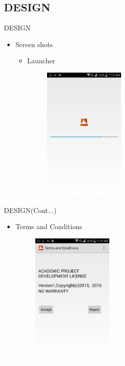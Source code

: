   
\subsection{DESIGN}
\begin{frame}{DESIGN}
\begin{itemize}
  	\item Screen shots  
   \begin{itemize}
  	\item Launcher 
 	 \begin{figure}[ht!]
     \centering
    \includegraphics[width=4cm]{launch.png}
    
    \label{fig:pc control launch}
\end{figure}
\end{itemize}
\end{itemize}
 \end{frame} 

\begin{frame}{DESIGN(Cont...)}  
   \begin{itemize}
  	\item Terms and Conditions 
 	 \begin{figure}[ht!]
     \centering
    \includegraphics[width=4cm]{terms.png}
    \label{fig:pc control login}
\end{figure}
   \end{itemize}
 \end{frame} 
 
